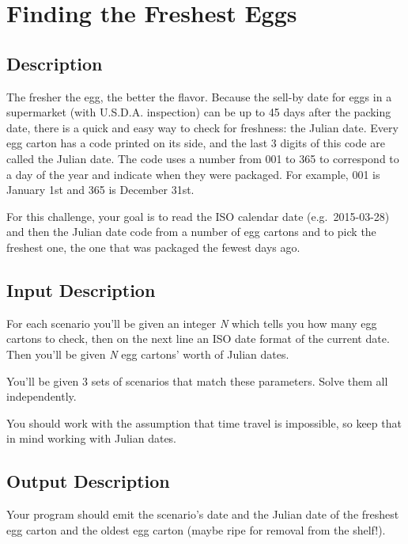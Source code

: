 \section{Finding the Freshest Eggs}

\subsection*{Description}\label{description-25}

The fresher the egg, the better the flavor. Because the sell-by date for
eggs in a supermarket (with U.S.D.A. inspection) can be up to 45 days
after the packing date, there is a quick and easy way to check for
freshness: the Julian date. Every egg carton has a code printed on its
side, and the last 3 digits of this code are called the Julian date. The
code uses a number from 001 to 365 to correspond to a day of the year
and indicate when they were packaged. For example, 001 is January 1st
and 365 is December 31st.

For this challenge, your goal is to read the ISO calendar date
(e.g.~2015-03-28) and then the Julian date code from a number of egg
cartons and to pick the freshest one, the one that was packaged the
fewest days ago.

\subsection*{Input Description}\label{input-description-17}

For each scenario you'll be given an integer \emph{N} which tells you
how many egg cartons to check, then on the next line an ISO date format
of the current date. Then you'll be given \emph{N} egg cartons' worth of
Julian dates.

You'll be given 3 sets of scenarios that match these parameters. Solve
them all independently.

You should work with the assumption that time travel is impossible, so
keep that in mind working with Julian dates.

\subsection*{Output Description}\label{output-description-18}

Your program should emit the scenario's date and the Julian date of the
freshest egg carton and the oldest egg carton (maybe ripe for removal
from the shelf!).

